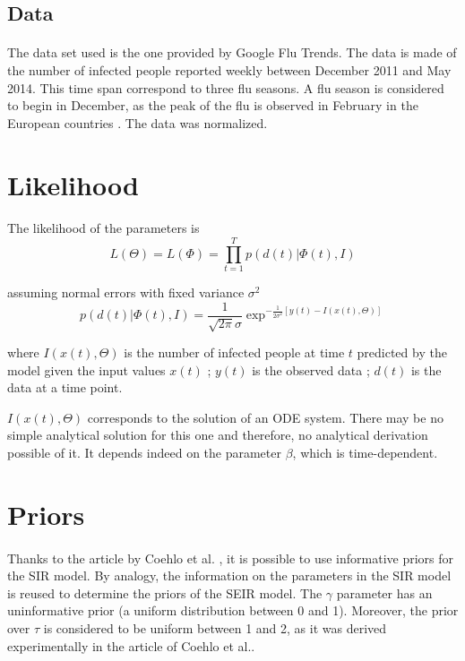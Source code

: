 \documentclass[11pt, a4paper]{article}
\begin{document}
\subsection{Data}
\paragraph{}
The data set used is the one provided by Google Flu Trends. The data is made of the number of infected people reported weekly between December 2011 and May 2014. This time span correspond to three flu seasons. A flu season is considered to begin in December, as the peak of the flu is observed in February in the European countries \cite{baumgartner2012seasonality}. The data was normalized. 

\section{Likelihood}
\paragraph{}
The likelihood of the parameters is 
\begin{equation}
L(\Theta) = L(\Phi) = \prod_{t=1}^T p( d(t) | \Phi(t),I) 
\label{eq:likelihood}
\end{equation}

assuming normal errors with fixed variance $\sigma^2$
\begin{equation}
p(d(t) | \Phi(t),I) = \frac{1}{\sqrt{2\pi}\sigma} \exp^{-\frac{1}{2\sigma^2}[y(t) - I(x(t), \Theta)]}
\label{eq:gaussianPrior}
\end{equation}

where $I(x(t), \Theta)$ is the number of infected people at time $t$ predicted by the model given the input values $x(t)$ ; $y(t)$ is the observed data ; $d(t)$ is the data at a time point.

$I(x(t), \Theta)$ corresponds to the solution of an ODE system. There may be no simple analytical solution for this one and therefore, no analytical derivation possible of it. It depends indeed on the parameter $\beta$, which is time-dependent.

\section{Priors}
\paragraph{}
Thanks to the article by Coehlo et al. \cite{coelho2011bayesian}, it is possible to use informative priors for the SIR model. By analogy, the information on the parameters in the SIR model is reused to determine the priors of the SEIR model. The $\gamma$ parameter has an uninformative prior (a uniform distribution between 0 and 1). Moreover, the prior over $\tau$ is considered to be uniform between 1 and 2, as it was derived experimentally in the article of Coehlo et al.\cite{coelho2011bayesian}. 
\end{document}
